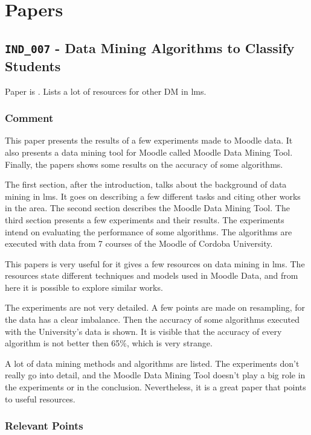 \section{Papers}

\subsection{\texttt{IND\_007} - Data Mining Algorithms to Classify Students}

Paper is \cite{ind_007}. Lists a lot of resources for other DM in \gls{lms}.

\subsubsection{Comment}

This paper presents the results of a few experiments made to Moodle data. It
also presents a data mining tool for Moodle called Moodle Data Mining Tool.
Finally, the papers shows some results on the accuracy of some algorithms.

The first section, after the introduction, talks about the background of data
mining in \gls{lms}. It goes on describing a few different tasks and citing
other works in the area. The second section describes the Moodle Data Mining
Tool. The third section presents a few experiments and their results. The
experiments intend on evaluating the performance of some algorithms. The
algorithms are executed with data from 7 courses of the Moodle of Cordoba
University.

This papers is very useful for it gives a few resources on data mining in
\gls{lms}. The resources state different techniques and models used in Moodle
Data, and from here it is possible to explore similar works.

The experiments are not very detailed. A few points are made on resampling, for
the data has a clear imbalance. Then the accuracy of some algorithms executed
with the University's data is shown. It is visible that the accuracy of every
algorithm is not better then 65\%, which is very strange.

A lot of data mining methods and algorithms are listed. The experiments don't
really go into detail, and the Moodle Data Mining Tool doesn't play a big role
in the experiments or in the conclusion. Nevertheless, it is a great paper that
points to useful resources.

\subsubsection{Relevant Points}

